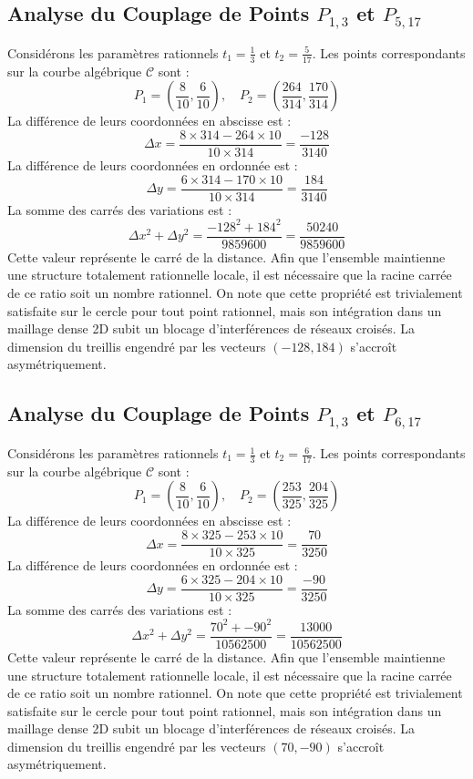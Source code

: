 \documentclass[12pt, a4paper]{article}
\begin{document}
\subsection{Analyse du Couplage de Points $P_{1,3}$ et $P_{5,17}$}
Considérons les paramètres rationnels $t_1 = \frac{1}{3}$ et $t_2 = \frac{5}{17}$.
Les points correspondants sur la courbe algébrique $\mathcal{C}$ sont :
$$ P_1 = \left( \frac{8}{10}, \frac{6}{10} \right), \quad P_2 = \left( \frac{264}{314}, \frac{170}{314} \right) $$
La différence de leurs coordonnées en abscisse est :
$$ \Delta x = \frac{8 \times 314 - 264 \times 10}{10 \times 314} = \frac{-128}{3140} $$
La différence de leurs coordonnées en ordonnée est :
$$ \Delta y = \frac{6 \times 314 - 170 \times 10}{10 \times 314} = \frac{184}{3140} $$
La somme des carrés des variations est :
$$ \Delta x^2 + \Delta y^2 = \frac{ -128^2 + 184^2 }{ 9859600 } = \frac{ 50240 }{ 9859600 } $$
Cette valeur représente le carré de la distance. Afin que l'ensemble maintienne une structure totalement rationnelle locale, il est nécessaire que la racine carrée de ce ratio soit un nombre rationnel. On note que cette propriété est trivialement satisfaite sur le cercle pour tout point rationnel, mais son intégration dans un maillage dense 2D subit un blocage d'interférences de réseaux croisés. La dimension du treillis engendré par les vecteurs $( -128, 184 )$ s'accroît asymétriquement.


\subsection{Analyse du Couplage de Points $P_{1,3}$ et $P_{6,17}$}
Considérons les paramètres rationnels $t_1 = \frac{1}{3}$ et $t_2 = \frac{6}{17}$.
Les points correspondants sur la courbe algébrique $\mathcal{C}$ sont :
$$ P_1 = \left( \frac{8}{10}, \frac{6}{10} \right), \quad P_2 = \left( \frac{253}{325}, \frac{204}{325} \right) $$
La différence de leurs coordonnées en abscisse est :
$$ \Delta x = \frac{8 \times 325 - 253 \times 10}{10 \times 325} = \frac{70}{3250} $$
La différence de leurs coordonnées en ordonnée est :
$$ \Delta y = \frac{6 \times 325 - 204 \times 10}{10 \times 325} = \frac{-90}{3250} $$
La somme des carrés des variations est :
$$ \Delta x^2 + \Delta y^2 = \frac{ 70^2 + -90^2 }{ 10562500 } = \frac{ 13000 }{ 10562500 } $$
Cette valeur représente le carré de la distance. Afin que l'ensemble maintienne une structure totalement rationnelle locale, il est nécessaire que la racine carrée de ce ratio soit un nombre rationnel. On note que cette propriété est trivialement satisfaite sur le cercle pour tout point rationnel, mais son intégration dans un maillage dense 2D subit un blocage d'interférences de réseaux croisés. La dimension du treillis engendré par les vecteurs $( 70, -90 )$ s'accroît asymétriquement.
\end{document}
